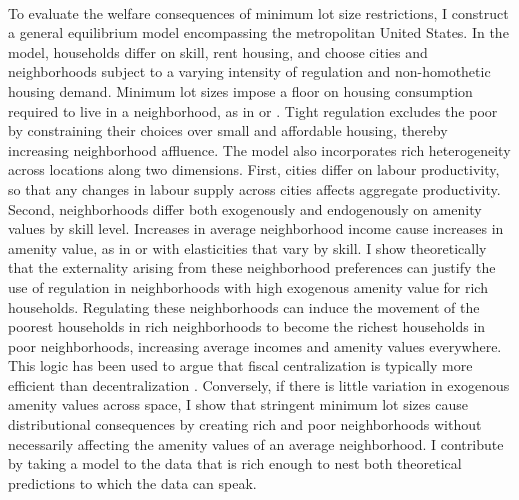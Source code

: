 \documentclass[12pt]{article}
\begin{document}
	\paragraph*{}
	To evaluate the welfare consequences of minimum lot size restrictions, I construct a general equilibrium model encompassing the metropolitan United States. In the model, households differ on skill, rent housing, and choose cities and neighborhoods subject to a varying intensity of regulation and non-homothetic housing demand. Minimum lot sizes impose a floor on housing consumption required to live in a neighborhood, as in \cite{kulka} or \cite{calabresetal}. Tight regulation excludes the poor by constraining their choices over small and affordable housing, thereby increasing neighborhood affluence. The model also incorporates rich heterogeneity across locations along two dimensions. First, cities differ on labour productivity, so that any changes in labour supply across cities affects aggregate productivity. Second, neighborhoods differ both exogenously and endogenously on amenity values by skill level. Increases in average neighborhood income cause increases in amenity value, as in \citet{parispoor} or \citet{ghh2013} with elasticities that vary by skill. I show theoretically that the externality arising from these neighborhood preferences can justify the use of regulation in neighborhoods with high exogenous amenity value for rich households. Regulating these neighborhoods can induce the movement of the poorest households in rich neighborhoods to become the richest households in poor neighborhoods, increasing average incomes and amenity values everywhere. This logic has been used to argue that fiscal centralization is typically more efficient than decentralization \citep{ineffTiebout}. Conversely, if there is little variation in exogenous amenity values across space, I show that stringent minimum lot sizes cause distributional consequences by creating rich and poor neighborhoods without necessarily affecting the amenity values of an average neighborhood. I contribute by taking a model to the data that is rich enough to nest both theoretical predictions to which the data can speak.
\end{document}
